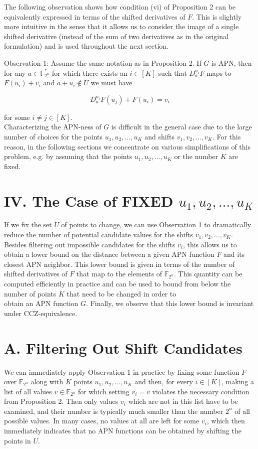 \documentclass[10pt]{article}
\begin{document}
The following observation shows how condition (vi) of Proposition 2 can be equivalently expressed in terms of the shifted derivatives of $F$. This is slightly more intuitive in the sense that it allows us to consider the image of a single shifted derivative (instead of the sum of two derivatives as in the original formulation) and is used throughout the next section.

Observation 1: Assume the same notation as in Proposition 2. If $G$ is APN, then for any $a \in \mathbb{F}_{2^{n}}^{*}$ for which there exists an $i \in[K]$ such that $D_{a}^{u_{i}} F$ maps to $F\left(u_{i}\right)+v_{i}$ and $a+u_{i} \notin U$ we must have

$$
D_{a}^{u_{i}} F\left(u_{j}\right)+F\left(u_{i}\right)=v_{i}
$$

for some $i \neq j \in[K]$.\\
Characterizing the APN-ness of $G$ is difficult in the general case due to the large number of choices for the points $u_{1}, u_{2}, \ldots, u_{K}$ and shifts $v_{1}, v_{2}, \ldots, v_{K}$. For this reason, in the following sections we concentrate on various simplifications of this problem, e.g. by assuming that the points $u_{1}, u_{2}, \ldots, u_{K}$ or the number $K$ are fixed.

\section*{IV. The Case of FIXED $u_{1}, u_{2}, \ldots, u_{K}$}
If we fix the set $U$ of points to change, we can use Observation 1 to dramatically reduce the number of potential candidate values for the shifts $v_{1}, v_{2}, \ldots, v_{K}$. Besides filtering out impossible candidates for the shifts $v_{i}$, this allows us to obtain a lower bound on the distance between a given APN function $F$ and its closest APN neighbor. This lower bound is given in terms of the number of shifted derivatives of $F$ that map to the elements of $\mathbb{F}_{2^{n}}$. This quantity can be computed efficiently in practice and can be used to bound from below the number of points $K$ that need to be changed in order to\\
obtain an APN function $G$. Finally, we observe that this lower bound is invariant under CCZ-equivalence.

\section*{A. Filtering Out Shift Candidates}
We can immediately apply Observation 1 in practice by fixing some function $F$ over $\mathbb{F}_{2^{n}}$ along with $K$ points $u_{1}, u_{2}, \ldots, u_{K}$ and then, for every $i \in[K]$, making a list of all values $\bar{v} \in \mathbb{F}_{2^{n}}$ for which setting $v_{i}=\bar{v}$ violates the necessary condition from Proposition 2. Then only values $v_{i}$ which are not in this list have to be examined, and their number is typically much smaller than the number $2^{n}$ of all possible values. In many cases, no values at all are left for some $v_{i}$, which then immediately indicates that no APN functions can be obtained by shifting the points in $U$.
\end{document}
